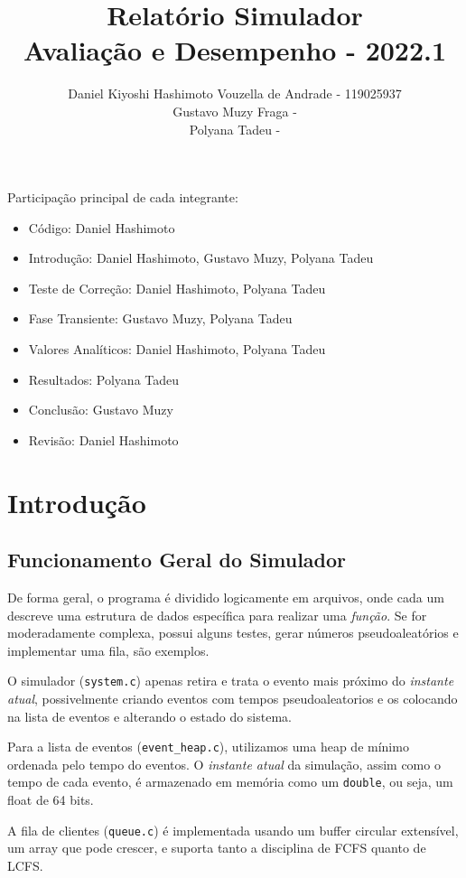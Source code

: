 \documentclass[a4paper]{article}
\title{Relatório Simulador\\
  Avaliação e Desempenho - 2022.1}
\author{Daniel Kiyoshi Hashimoto Vouzella de Andrade - 119025937
  \\
Gustavo Muzy Fraga -
  \\
Polyana Tadeu -
}
\date{}
\newcommand{\arq}{\texttt}
\newcommand{\inlcode}{\texttt}
\begin{document}
\maketitle

\vfill

Participação principal de cada integrante:
\begin{itemize}
    \item \large Código:
    \hfill Daniel Hashimoto
    \item \large Introdução:
    \hfill Daniel Hashimoto, Gustavo Muzy, Polyana Tadeu
    \item \large Teste de Correção:
    \hfill Daniel Hashimoto, Polyana Tadeu
    \item \large Fase Transiente:
    \hfill Gustavo Muzy, Polyana Tadeu
    \item \large Valores Analíticos:
    \hfill Daniel Hashimoto, Polyana Tadeu
    \item \large Resultados:
    \hfill Polyana Tadeu
    \item \large Conclusão:
    \hfill Gustavo Muzy
    \item \large Revisão:
    \hfill Daniel Hashimoto
\end{itemize}

\newpage
\section{Introdução}
\subsection{Funcionamento Geral do Simulador}
De forma geral,
o programa é dividido logicamente em arquivos,
onde cada um descreve uma estrutura de dados
específica para realizar uma \emph{função}.
Se for moderadamente complexa, possui alguns testes,
gerar números pseudoaleatórios e implementar uma fila,
são exemplos.

O simulador (\arq{system.c})
apenas retira e trata o evento mais próximo do \emph{instante atual},
possivelmente criando eventos com tempos pseudoaleatorios
e os colocando na lista de eventos e alterando o estado do sistema.

Para a lista de eventos (\arq{event\_heap.c}),
utilizamos uma heap de mínimo ordenada pelo tempo do eventos.
O \emph{instante atual} da simulação,
assim como o tempo de cada evento,
é armazenado em memória como um \inlcode{double}, ou seja,
um float de 64 bits.

A fila de clientes (\arq{queue.c})
é implementada usando um buffer circular extensível,
um array que pode crescer,
e suporta tanto a disciplina de FCFS quanto de LCFS.
\end{document}
